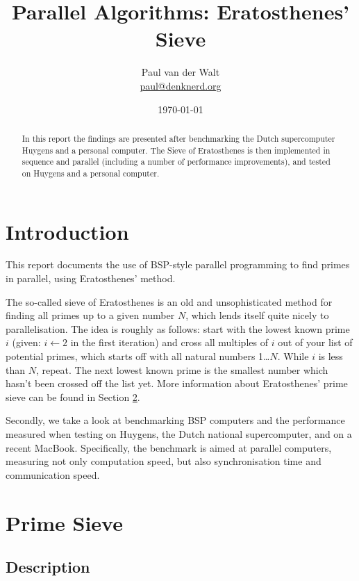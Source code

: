 \documentclass[a4paper]{article}
\author{Paul van der Walt\\\url{paul@denknerd.org}}
\date{\today}
\title{Parallel Algorithms: Eratosthenes' Sieve}
\begin{document}
\maketitle
\begin{abstract}
    In this report the findings are presented after benchmarking the Dutch
    supercomputer Huygens and a personal computer. The Sieve of Eratosthenes is
    then implemented in sequence and parallel (including a number of performance
    improvements), and tested on Huygens and a
    personal computer. 
\end{abstract}
\tableofcontents

\section{Introduction}

This report documents the use of BSP-style\cite{BSP} parallel programming to
find primes in parallel, using Eratosthenes' method. 

The so-called sieve of Eratosthenes is an old and unsophisticated method for
finding all primes up to a given number $N$, which lends itself quite nicely to
parallelisation. The idea is roughly as follows: start with the lowest known
prime $i$ (given: $i \leftarrow 2$ in the first iteration) and cross all
multiples of $i$ out of your list of potential primes, which starts off with all
natural numbers 1\ldots$N$. While $i$ is less than $N$, repeat. The next lowest
known prime is the smallest number which hasn't been crossed off the list yet.
More information about Eratosthenes' prime sieve can be found in Section
\ref{sec:sieve}. 

Secondly, we take a look at benchmarking BSP computers and the performance
measured when testing on Huygens\cite{sarahuygens}, the Dutch national
supercomputer, and on a recent MacBook. Specifically, the benchmark is aimed at
parallel computers, measuring not only computation speed, but also
synchronisation time and communication speed. 



\section{Prime Sieve}\label{sec:sieve}

\subsection{Description}
\end{document}
